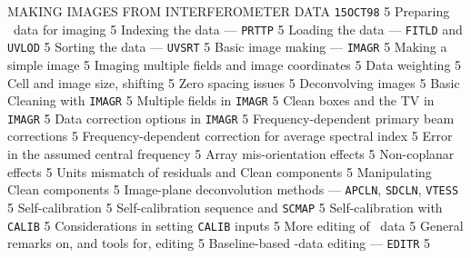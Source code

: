      {MAKING IMAGES FROM INTERFEROMETER DATA%
}                    {{\tt 15OCT98}\hskip 0.6cm 5}
   {Preparing \uv\ data for imaging}             {5}
 {Indexing the data --- {\tt PRTTP}}           {5}
 {Loading the data --- {\tt FITLD} and
                     {\tt UVLOD}}                             {5}
 {Sorting the data --- {\tt UVSRT}}            {5}
   {Basic image making --- {\tt IMAGR}}          {5}
 {Making a simple image}                       {5}
 {Imaging multiple fields and image
                     coordinates}                             {5}
 {Data weighting}                              {5}
 {Cell and image size, shifting}               {5}
 {Zero spacing issues}                         {5}
   {Deconvolving images}                         {5}
 {Basic Cleaning with {\tt IMAGR}}             {5}
 {Multiple fields in {\tt IMAGR}}              {5}
 {Clean boxes and the TV in {\tt IMAGR}}       {5}
 {Data correction options in {\tt IMAGR}}      {5}
 {Frequency-dependent primary beam
                     corrections}                             {5}
 {Frequency-dependent correction for
                     average spectral index}                  {5}
 {Error in the assumed central frequency}   {5}
 {Array mis-orientation effects}            {5}
 {Non-coplanar effects}                     {5}
 {Units mismatch of residuals and Clean
                    components}                               {5}
 {Manipulating Clean components}               {5}
 {Image-plane deconvolution methods --- {\tt APCLN},
                    {\tt SDCLN}, {\tt VTESS}}                 {5}
   {Self-calibration}                            {5}
 {Self-calibration sequence and {\tt SCMAP}}   {5}
 {Self-calibration with {\tt CALIB}}           {5}
 {Considerations in setting {\tt CALIB}
                    inputs}                                   {5}
   {More editing of \uv\ data}                   {5}
 {General remarks on, and tools for, editing}  {5}
 {Baseline-based \uv-data editing ---
                    {\tt EDITR}}                              {5}


